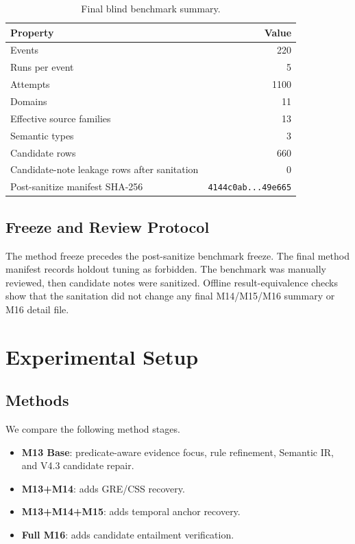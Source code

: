 \documentclass[11pt]{article}
\begin{document}
\begin{table}[t]
\centering
\caption{Final blind benchmark summary.}
\label{tab:dataset}
\begin{tabular}{lr}
\toprule
Property & Value \\
\midrule
Events & 220 \\
Runs per event & 5 \\
Attempts & 1100 \\
Domains & 11 \\
Effective source families & 13 \\
Semantic types & 3 \\
Candidate rows & 660 \\
Candidate-note leakage rows after sanitation & 0 \\
Post-sanitize manifest SHA-256 & \texttt{4144c0ab...49e665} \\
\bottomrule
\end{tabular}
\end{table}

\subsection{Freeze and Review Protocol}

The method freeze precedes the post-sanitize benchmark freeze. The final method manifest records holdout tuning as forbidden. The benchmark was manually reviewed, then candidate notes were sanitized. Offline result-equivalence checks show that the sanitation did not change any final M14/M15/M16 summary or M16 detail file.

\section{Experimental Setup}

\subsection{Methods}

We compare the following method stages.

\begin{itemize}
    \item \textbf{M13 Base}: predicate-aware evidence focus, rule refinement, Semantic IR, and V4.3 candidate repair.
    \item \textbf{M13+M14}: adds GRE/CSS recovery.
    \item \textbf{M13+M14+M15}: adds temporal anchor recovery.
    \item \textbf{Full M16}: adds candidate entailment verification.
\end{itemize}
\end{document}
